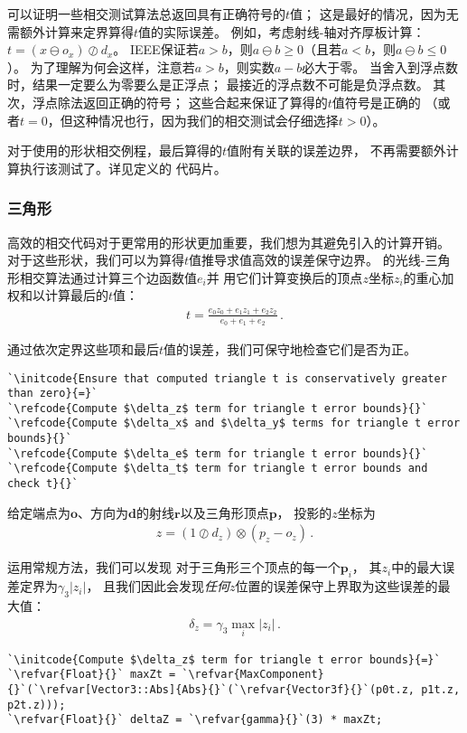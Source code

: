 可以证明一些相交测试算法总返回具有正确符号的$t$值；
这是最好的情况，因为无需额外计算来定界算得$t$值的实际误差。
例如，考虑射线-轴对齐厚板计算：$t=(x\ominus o_x)\oslash d_x$。
IEEE保证若$a>b$，则$a\ominus b\ge0$（且若$a<b$，则$a\ominus b\le0$）。
为了理解为何会这样，注意若$a>b$，则实数$a-b$必大于零。
当舍入到浮点数时，结果一定要么为零要么是正浮点；
最接近的浮点数不可能是负浮点数。
其次，浮点除法返回正确的符号；
这些合起来保证了算得的$t$值符号是正确的
（或者$t=0$，但这种情况也行，因为我们的相交测试会仔细选择$t>0$）。

对于使用的形状相交例程，最后算得的$t$值附有关联的误差边界，
不再需要额外计算执行该测试了。详见定义的
代码片。

\subsubsection*{三角形}

高效的相交代码对于更常用的形状更加重要，我们想为其避免引入的计算开销。
对于这些形状，我们可以为算得$t$值推导求值高效的误差保守边界。
的光线-三角形相交算法通过计算三个边函数值$e_i$并
用它们计算变换后的顶点$z$坐标$z_i$的重心加权和以计算最后的$t$值：
\begin{align}\label{eq:3.18}
    t=\frac{e_0z_0+e_1z_1+e_2z_2}{e_0+e_1+e_2}\, .
\end{align}

通过依次定界这些项和最后$t$值的误差，我们可保守地检查它们是否为正。
\begin{lstlisting}
`\initcode{Ensure that computed triangle t is conservatively greater than zero}{=}`
`\refcode{Compute $\delta_z$ term for triangle t error bounds}{}`
`\refcode{Compute $\delta_x$ and $\delta_y$ terms for triangle t error bounds}{}`
`\refcode{Compute $\delta_e$ term for triangle t error bounds}{}`
`\refcode{Compute $\delta_t$ term for triangle t error bounds and check t}{}`
\end{lstlisting}

给定端点为$\bm o$、方向为$\bm d$的射线$\bm r$以及三角形顶点$\bm p$，
投影的$z$坐标为
\begin{align*}
    z=(1\oslash d_z)\otimes(p_z-o_z)\, .
\end{align*}

运用常规方法，我们可以发现
对于三角形三个顶点的每一个$\bm p_i$，
其$z_i$中的最大误差定界为$\gamma_3|z_i|$，
且我们因此会发现\emph{任何}$z$位置的误差保守上界取为这些误差的最大值：
\begin{align*}
    \delta_z=\gamma_3\max_i{|z_i|}\, .
\end{align*}
\begin{lstlisting}
`\initcode{Compute $\delta_z$ term for triangle t error bounds}{=}`
`\refvar{Float}{}` maxZt = `\refvar{MaxComponent}{}`(`\refvar[Vector3::Abs]{Abs}{}`(`\refvar{Vector3f}{}`(p0t.z, p1t.z, p2t.z)));
`\refvar{Float}{}` deltaZ = `\refvar{gamma}{}`(3) * maxZt;
\end{lstlisting}


